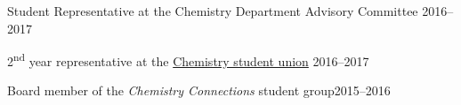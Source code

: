 \documentclass[margin,line]{res}
\begin{document}
\begin{resume}
Student Representative at the Chemistry Department Advisory Committee \hfill{2016--2017}

\vspace*{-2.5mm}

2\textsuperscript{nd} year representative at the \href{https://csu.sa.utoronto.ca/events-2013-2014/previous-executive-teams/exceutive-team-2015-2016/}{Chemistry student union} \hfill{2016--2017}

\vspace*{-2.5mm}

Board member of the {\em Chemistry Connections} student group\hfill {2015--2016}

\end{resume}

\newpage

\pagestyle{headings}
\end{document}
